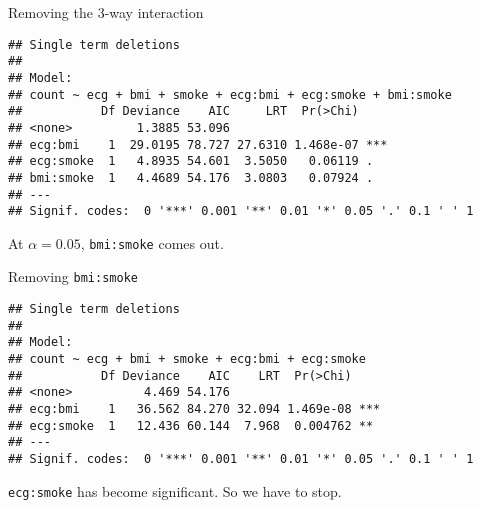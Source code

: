 \begin{frame}[fragile]{Removing the 3-way interaction}
  
\begin{knitrout}
\color{fgcolor}\begin{kframe}
\begin{alltt}
\hlkwb{=}\hlopt{~}\hlopt{-}\hlopt{:}\hlopt{:}
\hlstd{=}\hlstd{)}
\end{alltt}
\begin{verbatim}
## Single term deletions
## 
## Model:
## count ~ ecg + bmi + smoke + ecg:bmi + ecg:smoke + bmi:smoke
##           Df Deviance    AIC     LRT  Pr(>Chi)    
## <none>         1.3885 53.096                      
## ecg:bmi    1  29.0195 78.727 27.6310 1.468e-07 ***
## ecg:smoke  1   4.8935 54.601  3.5050   0.06119 .  
## bmi:smoke  1   4.4689 54.176  3.0803   0.07924 .  
## ---
## Signif. codes:  0 '***' 0.001 '**' 0.01 '*' 0.05 '.' 0.1 ' ' 1
\end{verbatim}
\end{kframe}
\end{knitrout}

At $\alpha=0.05$, \texttt{bmi:smoke} comes out.
  
\end{frame}

\begin{frame}[fragile]{Removing \texttt{bmi:smoke}}
  
\begin{knitrout}
\color{fgcolor}\begin{kframe}
\begin{alltt}
\hlkwb{=}\hlopt{~}\hlopt{-}\hlopt{:}
\hlstd{=}\hlstd{)}
\end{alltt}
\begin{verbatim}
## Single term deletions
## 
## Model:
## count ~ ecg + bmi + smoke + ecg:bmi + ecg:smoke
##           Df Deviance    AIC    LRT  Pr(>Chi)    
## <none>          4.469 54.176                     
## ecg:bmi    1   36.562 84.270 32.094 1.469e-08 ***
## ecg:smoke  1   12.436 60.144  7.968  0.004762 ** 
## ---
## Signif. codes:  0 '***' 0.001 '**' 0.01 '*' 0.05 '.' 0.1 ' ' 1
\end{verbatim}
\end{kframe}
\end{knitrout}

\texttt{ecg:smoke} has become significant. So we have to stop.
  
\end{frame}

